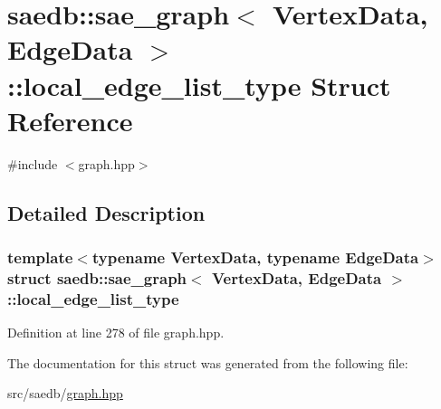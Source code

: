 \hypertarget{structsaedb_1_1sae__graph_1_1local__edge__list__type}{\section{saedb\-:\-:sae\-\_\-graph$<$ Vertex\-Data, Edge\-Data $>$\-:\-:local\-\_\-edge\-\_\-list\-\_\-type Struct Reference}
\label{d7/dec/structsaedb_1_1sae__graph_1_1local__edge__list__type}
}


{\ttfamily \#include $<$graph.\-hpp$>$}



\subsection{Detailed Description}
\subsubsection*{template$<$typename Vertex\-Data, typename Edge\-Data$>$struct saedb\-::sae\-\_\-graph$<$ Vertex\-Data, Edge\-Data $>$\-::local\-\_\-edge\-\_\-list\-\_\-type}



Definition at line 278 of file graph.\-hpp.



The documentation for this struct was generated from the following file\-:\begin{DoxyCompactItemize}
\item 
src/saedb/\hyperlink{graph_8hpp}{graph.\-hpp}\end{DoxyCompactItemize}

